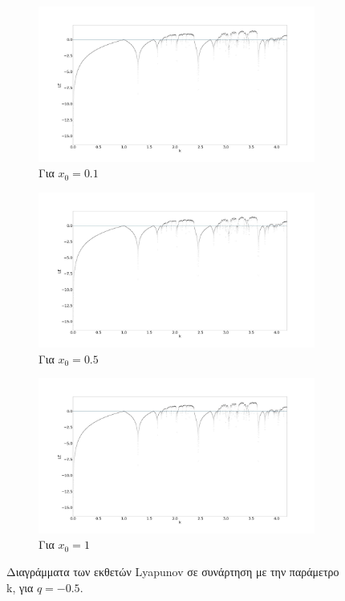 \begin{figure}[ht]
	\centering
	
	\begin{subfigure}[b]{0.8\textwidth}
		\centering
		\includegraphics[width=\textwidth]{LateX images/sine q=-0.5/g8}
		\caption{Για \(x_0=0.1\)}
		\label{f:g49}
	\end{subfigure}
	\hfill
	\begin{subfigure}[b]{0.8\textwidth}
		\centering
		\includegraphics[width=\textwidth]{LateX images/sine q=-0.5/g9}
		\caption{Για \(x_0=0.5\)}
		\label{f:g50}
	\end{subfigure}
	\hfill
	\begin{subfigure}[b]{0.8\textwidth}
		\centering
		\includegraphics[width=\textwidth]{LateX images/sine q=-0.5/g10}
		\caption{Για \(x_0=1\)}
		\label{f:g51}
	\end{subfigure}
	\hfill
	\caption{ Διαγράμματα των εκθετών Lyapunov σε συνάρτηση με την παράμετρο k, για $q=-0.5$.}
	\label{f:g236}
\end{figure}



